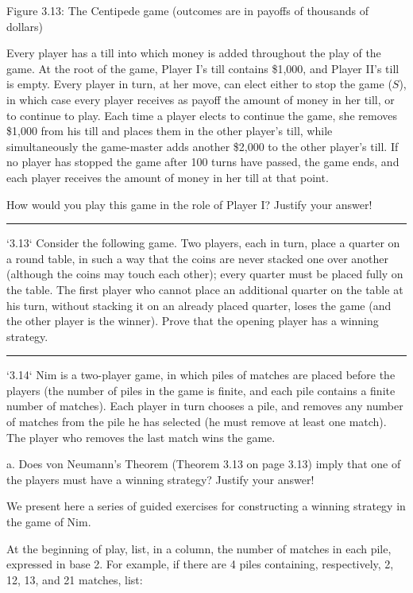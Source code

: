 \documentclass[10pt]{report}
\begin{document}
Figure 3.13: The Centipede game (outcomes are in payoffs of thousands of dollars)

Every player has a till into which money is added throughout the play of the game. At the root of the game, Player I's till contains \$1,000, and Player II's till is empty. Every player in turn, at her move, can elect either to stop the game ($S$), in which case every player receives as payoff the amount of money in her till, or to continue to play. Each time a player elects to continue the game, she removes \$1,000 from his till and places them in the other player's till, while simultaneously the game-master adds another \$2,000 to the other player's till. If no player has stopped the game after 100 turns have passed, the game ends, and each player receives the amount of money in her till at that point.

How would you play this game in the role of Player I? Justify your answer!

\vspace{0.5cm}
\hrule
\vspace{0.5cm}
`3.13` Consider the following game. Two players, each in turn, place a quarter on a round table, in such a way that the coins are never stacked one over another (although the coins may touch each other); every quarter must be placed fully on the table. The first player who cannot place an additional quarter on the table at his turn, without stacking it on an already placed quarter, loses the game (and the other player is the winner). Prove that the opening player has a winning strategy.

\vspace{0.5cm}
\hrule
\vspace{0.5cm}
`3.14` Nim is a two-player game, in which piles of matches are placed before the players (the number of piles in the game is finite, and each pile contains a finite number of matches). Each player in turn chooses a pile, and removes any number of matches from the pile he has selected (he must remove at least one match). The player who removes the last match wins the game.

a. Does von Neumann's Theorem (Theorem 3.13 on page 3.13) imply that one of the players must have a winning strategy? Justify your answer!

We present here a series of guided exercises for constructing a winning strategy in the game of Nim.

At the beginning of play, list, in a column, the number of matches in each pile, expressed in base 2. For example, if there are 4 piles containing, respectively, 2, 12, 13, and 21 matches, list:
\end{document}
